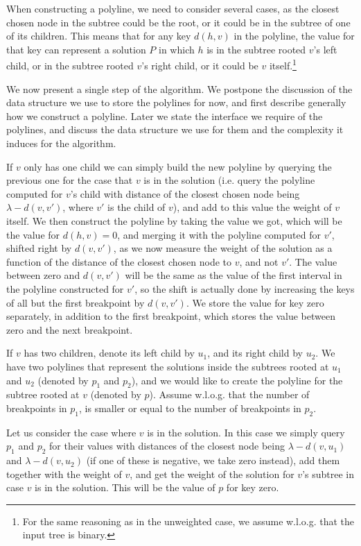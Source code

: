 \documentclass[11pt,a4paper]{article}
\theoremstyle{definition}
\theoremstyle{remark}
\begin{document}
When constructing a polyline, we need to consider several cases, as the closest chosen node in the subtree could be the root, or it could be in the subtree of one of its children. This means that for any key $d(h,v)$ in the polyline, the value for that key can represent a solution $P$ in which $h$ is in the subtree rooted $v$'s left child, or in the subtree rooted $v$'s right child, or it could be $v$ itself.\footnote{For the same reasoning as in the unweighted case, we assume w.l.o.g. that the input tree is binary.}

We now present a single step of the algorithm. We postpone the discussion of the data structure we use to store the polylines for now, and first describe generally how we construct a polyline. Later we state the interface we require of the polylines, and discuss the data structure we use for them and the complexity it induces for the algorithm.

If $v$ only has one child we can simply build the new polyline by querying the previous one for the case that $v$ is in the solution (i.e. query the polyline computed for $v$'s child with distance of the closest chosen node being $\lambda-d(v,v')$, where $v'$ is the child of $v$), and add to this value the weight of $v$ itself. We then construct the polyline by taking the value we got, which will be the value for $d(h,v)=0$, and merging it with the polyline computed for $v'$, shifted right by $d(v,v')$, as we now measure the weight of the solution as a function of the distance of the closest chosen node to $v$, and not $v'$. The value between zero and $d(v,v')$ will be the same as the value of the first interval in the polyline constructed for $v'$, so the shift is actually done by increasing the keys of all but the first breakpoint by $d(v,v')$. We store the value for key zero separately, in addition to the first breakpoint, which stores the value between zero and the next breakpoint.

If $v$ has two children, denote its left child by $u_1$, and its right child by $u_2$. We have two polylines that represent the solutions inside the subtrees rooted at $u_1$ and $u_2$ (denoted by $p_1$ and $p_2$), and we would like to create the polyline for the subtree rooted at $v$ (denoted by $p$).
Assume w.l.o.g. that the number of breakpoints in $p_1$, is smaller or equal to the number of breakpoints in $p_2$.

Let us consider the case where $v$ is in the solution. In this case we simply query $p_1$ and $p_2$ for their values with distances of the closest node being $\lambda - d(v,u_1)$ and $\lambda - d(v,u_2)$ (if one of these is negative, we take zero instead), add them together with the weight of $v$, and get the weight of the solution for $v$'s subtree in case $v$ is in the solution. This will be the value of $p$ for key zero.
\end{document}
